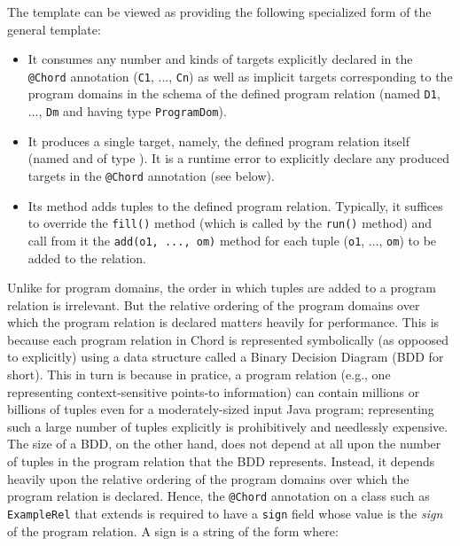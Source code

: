 The  template can be viewed as providing the following
specialized form of the general  template:

\begin{itemize}
\item
It consumes any number and kinds of targets explicitly declared in the
{\tt @Chord} annotation ({\tt C1}, ..., {\tt Cn}) as well as implicit targets
corresponding to the program domains in the schema of the defined program
relation (named {\tt D1}, ..., {\tt Dm} and having type {\tt ProgramDom}).
\item
It produces a single target, namely, the defined program relation itself
(named  and of type ).  It is a runtime error
to explicitly declare any produced targets in the {\tt @Chord} annotation (see
below).
\item
Its  method adds tuples to the defined program relation.  Typically,
it suffices to override the {\tt fill()} method (which is called by the
{\tt run()} method) and call from it the {\tt add(o1, ..., om)} method for each
tuple ({\tt o1}, ..., {\tt om}) to be added to the relation.
\end{itemize}

Unlike for program domains, the order in which tuples are added to a program
relation is irrelevant.  But the relative ordering of the program domains over
which the program relation is declared matters heavily for performance.
This is because each program relation in Chord is represented symbolically (as
oppoosed to explicitly) using a data structure called a Binary Decision Diagram
(BDD for short).  This in turn is because in pratice, a program relation (e.g.,
one representing context-sensitive points-to information)
can contain millions or billions of tuples even for a moderately-sized
input Java program; representing such a large number of tuples explicitly is
prohibitively and needlessly expensive.  The size of a BDD, on the other hand,
does not depend at all upon the number of tuples in the program relation that
the BDD represents.  Instead, it depends heavily upon the relative ordering
of the program domains over which the program relation is declared.
Hence, the {\tt @Chord} annotation on a class such as {\tt ExampleRel} that
extends  is required to have a {\tt sign} field whose value is
the {\it sign} of the program relation.
A sign is a string of the form  where:

